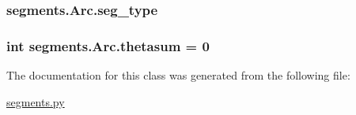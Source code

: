 \subsubsection[{seg\+\_\+type}]{\setlength{\rightskip}{0pt plus 5cm}segments.\+Arc.\+seg\+\_\+type}\label{classsegments_1_1_arc_a71c20a4b59a2be61ce95288f70d9fc20}
\hypertarget{classsegments_1_1_arc_a5f0e51ef80f616c6a5ccf07a29d6a1de}{}
\subsubsection[{thetasum}]{\setlength{\rightskip}{0pt plus 5cm}int segments.\+Arc.\+thetasum = 0\hspace{0.3cm}{\ttfamily [static]}}\label{classsegments_1_1_arc_a5f0e51ef80f616c6a5ccf07a29d6a1de}


The documentation for this class was generated from the following file\+:\begin{DoxyCompactItemize}
\item 
\hyperlink{segments_8py}{segments.\+py}\end{DoxyCompactItemize}

